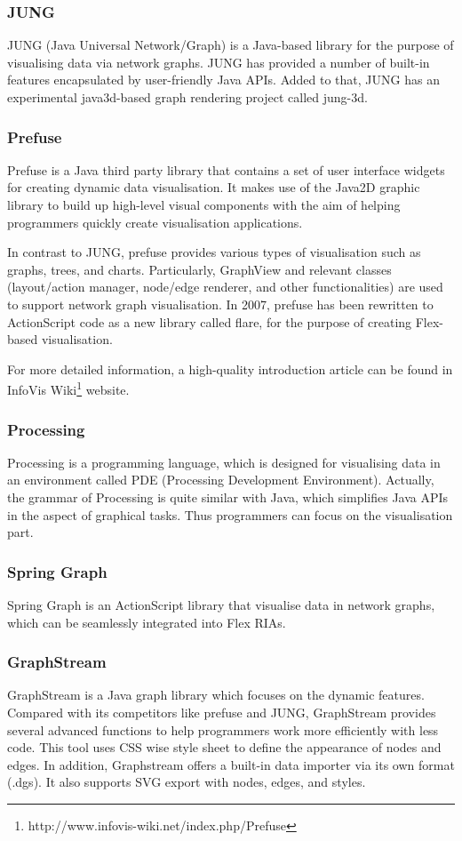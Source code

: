 \subsubsection{JUNG}
JUNG (Java Universal Network/Graph) is a Java-based library for the purpose of visualising data via network graphs. JUNG has provided a number of built-in features encapsulated by user-friendly Java APIs.
Added to that, JUNG has an experimental java3d-based graph rendering project called jung-3d.

\subsubsection{Prefuse}
Prefuse is a Java third party library that contains a set of user interface widgets for creating dynamic data visualisation. It makes use of the Java2D graphic library to build up high-level visual components with the aim of helping programmers quickly create visualisation applications.

In contrast to JUNG, prefuse provides various types of visualisation such as graphs, trees, and charts. Particularly, GraphView and relevant classes (layout/action manager, node/edge renderer, and other functionalities) are used to support network graph visualisation.
In 2007, prefuse has been rewritten to ActionScript code as a new library called flare, for the purpose of creating Flex-based visualisation.

For more detailed information, a high-quality introduction article can be found in InfoVis Wiki\footnote{http://www.infovis-wiki.net/index.php/Prefuse} website.

\subsubsection{Processing}
Processing is a programming language, which is designed for visualising data in an environment called PDE (Processing Development Environment). Actually, the grammar of Processing is quite similar with Java, which simplifies Java APIs in the aspect of graphical tasks. Thus programmers can focus on the visualisation part.

\subsubsection{Spring Graph}
Spring Graph is an ActionScript library that visualise data in network graphs, which can be seamlessly integrated into Flex RIAs.

\subsubsection{GraphStream}
GraphStream is a Java graph library which focuses on the dynamic features. Compared with its competitors like prefuse and JUNG, GraphStream provides several advanced functions to help programmers work more efficiently with less code. This tool uses CSS wise style sheet to define the appearance of nodes and edges. In addition, Graphstream offers a built-in data importer via its own format (.dgs). It also supports SVG export with nodes, edges, and styles.


